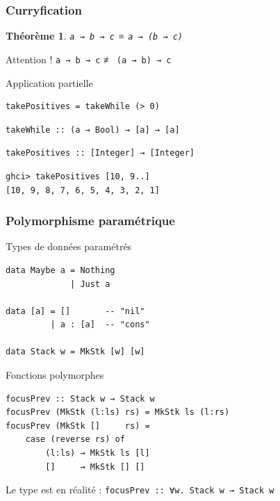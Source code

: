 \documentclass[10pt]{beamer}
\newtheorem{thrm}{Théorème}
\begin{document}
\begin{frame}[fragile]
\frametitle{Curryfication}
\begin{thrm}
\verb|a → b → c| ≡ \verb|a → (b → c)|
\end{thrm}

\pause

\begin{block}
{Attention !}
\verb|a → b → c| ≢ \verb|(a → b) → c|
\end{block}

\pause

\begin{block}
{Application partielle}
\begin{verbatim}
takePositives = takeWhile (> 0)
\end{verbatim}
\pause
\begin{verbatim}
takeWhile :: (a → Bool) → [a] → [a]
\end{verbatim}
\pause
\begin{verbatim}
takePositives :: [Integer] → [Integer]
\end{verbatim}
\pause
\begin{verbatim}
ghci> takePositives [10, 9..]
[10, 9, 8, 7, 6, 5, 4, 3, 2, 1]
\end{verbatim}
\end{block}
\end{frame}



\begin{frame}[fragile]
\frametitle{Polymorphisme paramétrique}
\begin{block}
{Types de données paramétrés}
\begin{verbatim}
data Maybe a = Nothing
             | Just a

data [a] = []       -- "nil"
         | a : [a]  -- "cons"

data Stack w = MkStk [w] [w]
\end{verbatim}
\end{block}
\pause
\begin{block}
{Fonctions polymorphes}
\begin{verbatim}
focusPrev :: Stack w → Stack w
focusPrev (MkStk (l:ls) rs) = MkStk ls (l:rs)
focusPrev (MkStk []     rs) =
    case (reverse rs) of
        (l:ls) → MkStk ls [l]
        []     → MkStk [] []
\end{verbatim}
\end{block}
Le type est en réalité : \verb|focusPrev :: ∀w. Stack w → Stack w|
\end{frame}
\end{document}
